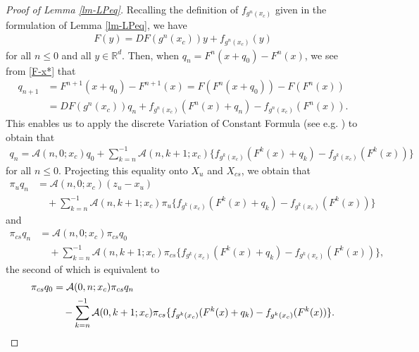 \documentclass[reqno]{amsart}
\numberwithin{equation}{section}
\begin{document}
\begin{proof}[Proof of Lemma \ref{lm-LPeq}]
Recalling the definition of $f_{g^n(x_c)}$ given in the formulation of Lemma \ref{lm-LPeq}, we have
\begin{align}\label{F-x*}
F(y)=DF(g^n(x_c))y+f_{g^n(x_c)}(y)
\end{align}
for all $n\le 0$ and all $y\in\mathbb{R}^d$.
Then, when $q_n=F^n(x+q_0)- F^n(x)$, we see from \eqref{F-x*} that
\begin{align}\label{qqFF}
q_{n+1}&=F^{n+1}(x+q_0)-F^{n+1}(x)=F(F^n(x+q_0))-F(F^n(x))
\nonumber\\
&=DF(g^n(x_c))q_n+f_{g^n(x_c)}(F^{n}(x)+q_n)
-f_{g^n(x_c)}(F^{n}(x)).
\end{align}
This enables us to apply the discrete Variation of Constant Formula (see e.g. \cite[Theorem 3.17]{Elaydi-book}) to obtain that
\begin{align*}
q_n
=\mathcal{A}(n,0;x_c)q_0
+
  \sum_{k=n}^{-1} \mathcal{A}(n,k+1;x_c)  \{f_{g^k(x_c)}(F^k(x)+q_k)-f_{g^k(x_c)}(F^k(x)) \}
\end{align*}
for all $n\le 0$.
Projecting this equality onto $X_u$ and $X_{cs}$, we obtain that
\begin{align}\label{LP-qqq}
\pi_u q_n &= \mathcal{A}(n,0;x_c) (z_u-x_u)
\nonumber\\
&\quad+\sum_{k=n}^{-1} \mathcal{A}(n,k+1;x_c)\pi_u \{f_{g^k(x_c)}(F^k(x)+q_k)-f_{g^k(x_c)}(F^k(x)) \}
\end{align}
and
\begin{align}\label{Lppp}
\pi_{cs}q_n &=\mathcal{A}(n,0;x_c) \pi_{cs} q_0
\nonumber\\
&\quad+\sum_{k=n}^{-1} \mathcal{A}(n,k+1;x_c)\pi_{cs} \{f_{g^k(x_c)}(F^k(x)+q_k)-f_{g^k(x_c)}(F^k(x)) \},
\end{align}
the second of which is equivalent to
\begin{align}\label{Lppp2}
\pi_{cs} q_0 &=\mathcal{A}(0,n;x_c) \pi_{cs} q_n
\notag \\
&\quad-\sum_{k=n}^{-1} \mathcal{A}(0,k+1;x_c) \pi_{cs}  \{f_{g^k(x_c)}(F^k(x)+q_k)-f_{g^k(x_c)}(F^k(x)) \}.
\end{align}



\end{proof}
\end{document}
